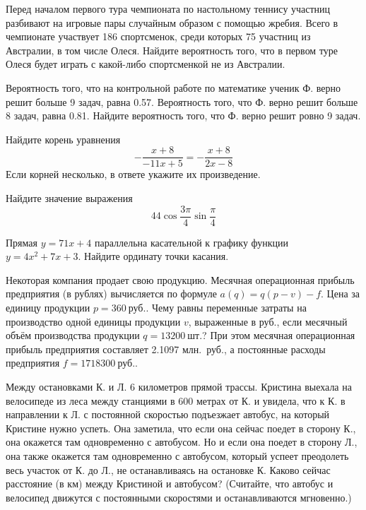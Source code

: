\documentclass[twocolumn]{article}
\begin{document}
\begin{taskBN}{3}
Перед началом первого тура чемпионата по настольному теннису участниц разбивают на игровые пары случайным образом с помощью жребия. Всего в чемпионате участвует 186 спортсменок, среди которых 75 участниц из Австралии, в том числе Олеся. Найдите вероятность того, что в первом туре Олеся будет играть с какой-либо спортсменкой не из Австралии.
\end{taskBN}

\begin{taskBN}{4}
Вероятность того, что на контрольной работе по математике ученик Ф. верно решит больше 9 задач, равна 0.57. Вероятность того, что Ф. верно решит больше 8 задач, равна 0.81. Найдите вероятность того, что Ф. верно решит ровно 9 задач.
\end{taskBN}

\begin{taskBN}{5}
Найдите корень уравнения $$-\frac{x+8}{-11x+5}=-\frac{x+8}{2x-8}$$ Если корней несколько, в ответе укажите их произведение.
\end{taskBN}

\begin{taskBN}{6}
Найдите значение выражения $$44\cos\frac{3\pi}{4}\sin\frac{\pi}{4}$$
\end{taskBN}

\begin{taskBN}{7}
Прямая $y=71x+4$ параллельна касательной к графику функции $y=4x^{2}+7x+3$. Найдите ординату точки касания.
\end{taskBN}

\begin{taskBN}{8}
Некоторая компания продает свою продукцию. Месячная операционная прибыль предприятия (в рублях) вычисляется по формуле $a(q)=q(p-v)-f$. Цена за единицу продукции $p=360~\mbox{руб}.$. Чему равны переменные затраты на производство одной единицы продукции $v$, выраженные в \mbox{руб}., если месячный объём производства продукции $q=13200~\mbox{шт}.$? При этом месячная операционная прибыль предприятия составляет 2.1097 \mbox{млн. руб}., а постоянные расходы предприятия $f=1718300~\mbox{руб}.$. 
\end{taskBN}

\begin{taskBN}{9}
Между остановками К. и Л. 6 километров прямой трассы. Кристина выехала на велосипеде из леса между станциями в 600 метрах от К. и увидела, что к К. в направлении к Л. с постоянной скоростью подъезжает автобус, на который Кристине нужно успеть. Она заметила, что если она сейчас поедет в сторону К., она окажется там одновременно с автобусом. Но и если она поедет в сторону Л., она также окажется там одновременно с автобусом, который успеет преодолеть весь участок от К. до Л., не останавливаясь на остановке К. Каково сейчас расстояние (в км) между Кристиной и автобусом?  (Считайте, что автобус и велосипед движутся с постоянными скоростями и останавливаются мгновенно.)
\end{taskBN}
\end{document}
